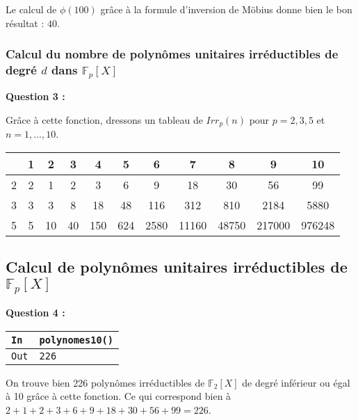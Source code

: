 \documentclass[titlepage]{article}
\begin{document}
            Le calcul de $\phi (100)$ grâce à la formule d'inversion de Möbius donne bien le bon résultat : $40$.

            \subsubsection{Calcul du nombre de polynômes unitaires irréductibles de degré $d$ dans $\mathbb{F}_p[X]$}
            \textbf{Question 3 :}
            
            Grâce à cette fonction, dressons un tableau de $Irr_p(n)$ pour $p = 2, 3, 5$ et $n = 1, . . . , 10$.

            \begin{tabular}{|c|c c c c c c c c c c|}
                \hline
                & 1 & 2 & 3 & 4 & 5 & 6 & 7 & 8 & 9 & 10 \\
                \hline
                2 & 2 & 1 & 2 & 3 & 6 & 9 & 18 & 30 & 56 & 99 \\
                3 & 3 & 3 & 8 & 18 & 48 & 116 & 312 & 810 & 2184 & 5880 \\
                5 & 5 & 10 & 40 & 150 & 624 & 2580 & 11160 &  48750 & 217000 & 976248 \\ 
                \hline
            \end{tabular}
            \bigbreak

            \subsection{Calcul de polynômes unitaires irréductibles de $\mathbb{F}_p[X]$}

            \textbf{Question 4 :}
            

            \begin{tabularx}{12cm}{|p{0.60cm}|X|}
                \hline
                \rowcolor{gray}
                \texttt{In}
                & 
                \texttt{polynomes10()}
                \\
                \hline
                \texttt{Out}
                &
                \texttt{226}
                \\
                \hline
            \end{tabularx}
            \bigbreak

            On trouve bien 226 polynômes irréductibles de $\mathbb{F}_2[X]$ de degré inférieur ou égal à 10 grâce à cette fonction.
            Ce qui correspond bien à $2 + 1 + 2 + 3 + 6 + 9 + 18 + 30 + 56 + 99 = 226$.
\end{document}
